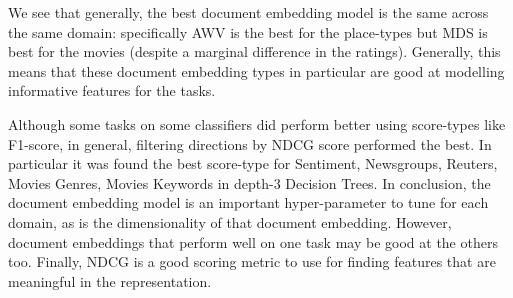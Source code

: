 We see that generally, the best document embedding model is the same across the same domain: specifically AWV is the best for the place-types but MDS is best for the movies (despite a marginal difference in the ratings). Generally, this  means that these document embedding types in particular are good at modelling informative features for the tasks. 
 
 Although some tasks on some classifiers did perform better using score-types like F1-score, in general, filtering directions by NDCG score performed the best. In particular it was found  the best score-type for Sentiment, Newsgroups, Reuters, Movies Genres, Movies Keywords in depth-3 Decision Trees.  In conclusion, the document embedding model is an important hyper-parameter to tune for each domain, as is the dimensionality of that document embedding. However, document embeddings that perform well on one task may be good at the others too. Finally, NDCG is a good scoring metric to use for finding features that are meaningful in the representation.
 



